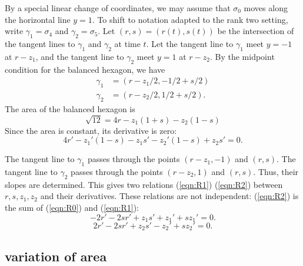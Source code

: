 \documentclass[11pt]{amsart}
\begin{document}
By a special linear change of coordinates, we may assume that $\sigma_0$ moves along
the horizontal line $y=1$.  To shift to notation adapted to the rank two setting,  
write $\gamma_1=\sigma_4$ and $\gamma_2 = \sigma_5$.
Let $(r,s)=(r(t),s(t))$ be the intersection of the tangent lines to $\gamma_1$ and $\gamma_2$
at time $t$.  Let the tangent line to $\gamma_1$ meet $y=-1$ at $r-z_1$, and the
tangent line to $\gamma_2$ meet $y=1$ at $r-z_2$.  By the midpoint condition for
the balanced hexagon, we have 
   \begin{equation}\label{eqn:gamma}
   \begin{array}{lll}
     \gamma_1 &= (r-z_1/2,-1/2+s/2)\\
     \gamma_2 &= (r-z_2/2,1/2+s/2).
     \end{array}
   \end{equation}
The area of the balanced hexagon is 
\begin{equation}
\sqrt{12}= 4r - z_1 (1+s) - z_2 (1-s)
\end{equation} 
  Since the area is constant, its derivative is zero:
   \begin{equation}%
   \label{eqn:R0}
     4 r' - z_1' (1-s) - z_1  s' - z_2' (1-s) + z_2 s' = 0.
     \end{equation}

The tangent line to $\gamma_1$ passes through the points $(r-z_1,-1)$ and $(r,s)$.  The tangent line to $\gamma_2$ passes through the points $(r-z_2,1)$ and $(r,s)$.  Thus, their slopes are determined.  This gives two relations (\ref{eqn:R1})  (\ref{eqn:R2}) between $r,s,z_1,z_2$ and their derivatives.  These relations are not independent: (\ref{eqn:R2}) is the sum of (\ref{eqn:R0}) and (\ref{eqn:R1}):
  \begin{equation}\label{eqn:R1}
      -2 r' - 2 s r' + z_1 s' + z_1' + s z_1' =0.
    \end{equation}
  \begin{equation}\label{eqn:R2}
       2 r' - 2 s r' + z_2 s' - z_2' + s z_2' = 0.
      \end{equation}

\subsection{variation of area}
\end{document}
